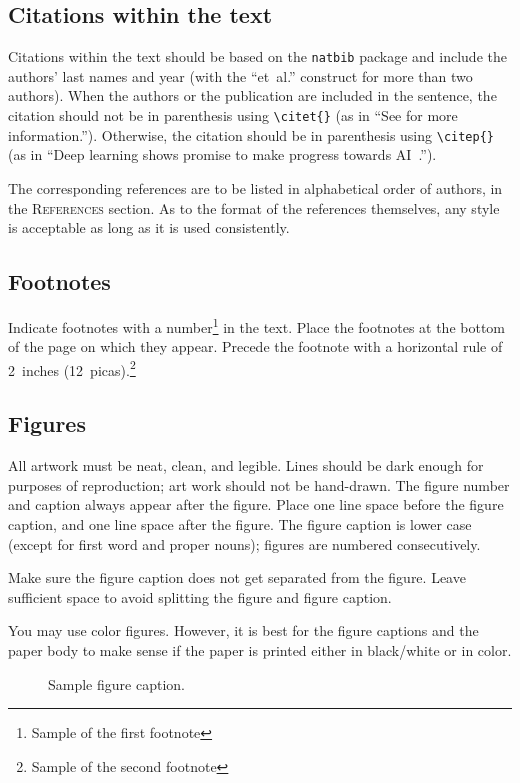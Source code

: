 \documentclass{article} %
\theoremstyle{plain}
\theoremstyle{definition}
\theoremstyle{remark}
\begin{document}
\subsection{Citations within the text}

Citations within the text should be based on the \texttt{natbib} package
and include the authors' last names and year (with the ``et~al.'' construct
for more than two authors). When the authors or the publication are
included in the sentence, the citation should not be in parenthesis using \verb|\citet{}| (as
in ``See \citet{Hinton06} for more information.''). Otherwise, the citation
should be in parenthesis using \verb|\citep{}| (as in ``Deep learning shows promise to make progress
towards AI~\citep{Bengio+chapter2007}.'').

The corresponding references are to be listed in alphabetical order of
authors, in the \textsc{References} section. As to the format of the
references themselves, any style is acceptable as long as it is used
consistently.

\subsection{Footnotes}

Indicate footnotes with a number\footnote{Sample of the first footnote} in the
text. Place the footnotes at the bottom of the page on which they appear.
Precede the footnote with a horizontal rule of 2~inches
(12~picas).\footnote{Sample of the second footnote}

\subsection{Figures}

All artwork must be neat, clean, and legible. Lines should be dark
enough for purposes of reproduction; art work should not be
hand-drawn. The figure number and caption always appear after the
figure. Place one line space before the figure caption, and one line
space after the figure. The figure caption is lower case (except for
first word and proper nouns); figures are numbered consecutively.

Make sure the figure caption does not get separated from the figure.
Leave sufficient space to avoid splitting the figure and figure caption.

You may use color figures.
However, it is best for the
figure captions and the paper body to make sense if the paper is printed
either in black/white or in color.
\begin{figure}[h]
\begin{center}
\fbox{\rule[-.5cm]{0cm}{4cm} \rule[-.5cm]{4cm}{0cm}}
\end{center}
\caption{Sample figure caption.}
\end{figure}
\end{document}
